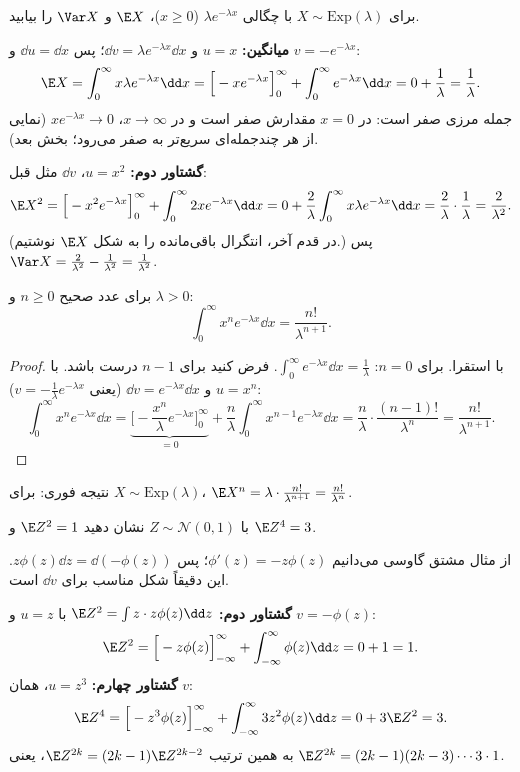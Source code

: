 \begin{example}
برای $X\sim\mathrm{Exp}(\lambda)$ با چگالی $\lambda e^{-\lambda x}$ ($x\ge0$)، $\E X$ و $\Var X$ را بیابید.
\begin{solution}
\textbf{میانگین:} $u=x$ و $\dd v=\lambda e^{-\lambda x}\dd x$؛ پس $\dd u=\dd x$ و $v=-e^{-\lambda x}$:
\[
\E X=\int_0^\infty x\lambda e^{-\lambda x}\dd x=\Big[-xe^{-\lambda x}\Big]_0^\infty+\int_0^\infty e^{-\lambda x}\dd x=0+\frac1\lambda=\frac1\lambda .
\]
جمله مرزی صفر است: در $x=0$ مقدارش صفر است و در $x\to\infty$، $xe^{-\lambda x}\to0$ (نمایی از هر چندجمله‌ای سریع‌تر به صفر می‌رود؛ بخش بعد).

\textbf{گشتاور دوم:} $u=x^2$، $\dd v$ مثل قبل:
\[
\E X^2=\Big[-x^2e^{-\lambda x}\Big]_0^\infty+\int_0^\infty2xe^{-\lambda x}\dd x=0+\frac2\lambda\int_0^\infty x\lambda e^{-\lambda x}\dd x=\frac2\lambda\cdot\frac1\lambda=\frac{2}{\lambda^2}.
\]
(در قدم آخر، انتگرال باقی‌مانده را به شکل $\E X$ نوشتیم.) پس $\Var X=\frac{2}{\lambda^2}-\frac{1}{\lambda^2}=\frac{1}{\lambda^2}$.
\end{solution}
\end{example}

\begin{theorem}
برای عدد صحیح $n\ge0$ و $\lambda>0$:
\[
\int_0^\infty x^ne^{-\lambda x}\dd x=\frac{n!}{\lambda^{n+1}}.
\]
\end{theorem}
\begin{proof}
با استقرا. برای $n=0$: $\int_0^\infty e^{-\lambda x}\dd x=\frac1\lambda$. فرض کنید برای $n-1$ درست باشد. با $u=x^n$ و $\dd v=e^{-\lambda x}\dd x$ (یعنی $v=-\frac1\lambda e^{-\lambda x}$):
\[
\int_0^\infty x^ne^{-\lambda x}\dd x=\underbrace{\Big[-\frac{x^n}{\lambda}e^{-\lambda x}\Big]_0^\infty}_{=0}+\frac n\lambda\int_0^\infty x^{n-1}e^{-\lambda x}\dd x=\frac n\lambda\cdot\frac{(n-1)!}{\lambda^n}=\frac{n!}{\lambda^{n+1}} .
\]
\end{proof}
نتیجه فوری: برای $X\sim\mathrm{Exp}(\lambda)$، $\E X^n=\lambda\cdot\frac{n!}{\lambda^{n+1}}=\frac{n!}{\lambda^n}$.

\begin{example}
با $Z\sim\mathcal N(0,1)$ نشان دهید $\E Z^2=1$ و $\E Z^4=3$.
\begin{solution}
از مثال مشتق گاوسی می‌دانیم $\phi'(z)=-z\phi(z)$؛ پس $z\phi(z)\dd z=\dd(-\phi(z))$. این دقیقاً شکل مناسب برای $\dd v$ است.

\textbf{گشتاور دوم:} $\E Z^2=\int z\cdot z\phi(z)\dd z$ با $u=z$ و $v=-\phi(z)$:
\[
\E Z^2=\Big[-z\phi(z)\Big]_{-\infty}^{\infty}+\int_{-\infty}^{\infty}\phi(z)\dd z=0+1=1 .
\]
\textbf{گشتاور چهارم:} $u=z^3$، همان $v$:
\[
\E Z^4=\Big[-z^3\phi(z)\Big]_{-\infty}^{\infty}+\int_{-\infty}^{\infty}3z^2\phi(z)\dd z=0+3\E Z^2=3 .
\]
به همین ترتیب $\E Z^{2k}=(2k-1)\E Z^{2k-2}$، یعنی $\E Z^{2k}=(2k-1)(2k-3)\cdots3\cdot1$.
\end{solution}
\end{example}

